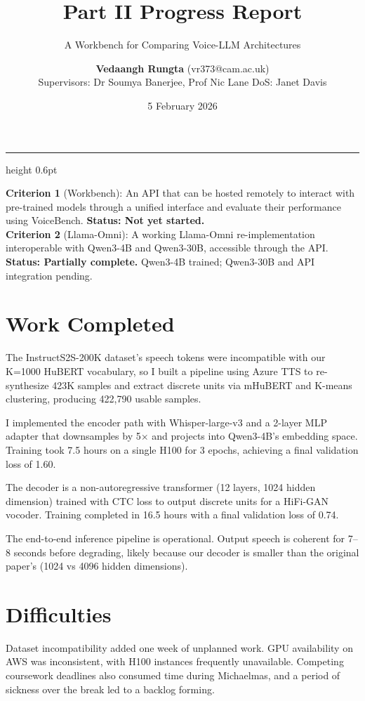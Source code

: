 \documentclass[11pt,a4paper]{scrartcl}
\title{\vspace{-1.5em}\textbf{Part II Progress Report}}
\subtitle{A Workbench for Comparing Voice-LLM Architectures}
\author{
  \textbf{Vedaangh Rungta} (vr373@cam.ac.uk)\\[0.2em]
  \small Supervisors: Dr Soumya Banerjee, Prof Nic Lane \quad DoS: Janet Davis
}
\date{5 February 2026}
\begin{document}
\maketitle
\vspace{-1.5em}
\hrule height 0.6pt \vspace{0.6em}

\begin{successbox}
\textbf{Criterion 1} (Workbench): An API that can be hosted remotely to interact with pre-trained models through a unified interface and evaluate their performance using VoiceBench. \textbf{Status: Not yet started.}\\[0.3em]
\textbf{Criterion 2} (Llama-Omni): A working Llama-Omni re-implementation interoperable with Qwen3-4B and Qwen3-30B, accessible through the API. \textbf{Status: Partially complete.} Qwen3-4B trained; Qwen3-30B and API integration pending.
\end{successbox}

\section{Work Completed}

The InstructS2S-200K dataset's speech tokens were incompatible with our K=1000 HuBERT vocabulary, so I built a pipeline using Azure TTS to re-synthesize 423K samples and extract discrete units via mHuBERT and K-means clustering, producing 422,790 usable samples.

I implemented the encoder path with Whisper-large-v3 and a 2-layer MLP adapter that downsamples by 5$\times$ and projects into Qwen3-4B's embedding space. Training took 7.5 hours on a single H100 for 3 epochs, achieving a final validation loss of 1.60.

The decoder is a non-autoregressive transformer (12 layers, 1024 hidden dimension) trained with CTC loss to output discrete units for a HiFi-GAN vocoder. Training completed in 16.5 hours with a final validation loss of 0.74.

The end-to-end inference pipeline is operational. Output speech is coherent for 7--8 seconds before degrading, likely because our decoder is smaller than the original paper's (1024 vs 4096 hidden dimensions).

\section{Difficulties}

Dataset incompatibility added one week of unplanned work. GPU availability on AWS was inconsistent, with H100 instances frequently unavailable. Competing coursework deadlines also consumed time during Michaelmas, and a period of sickness over the break led to a backlog forming.
\end{document}
